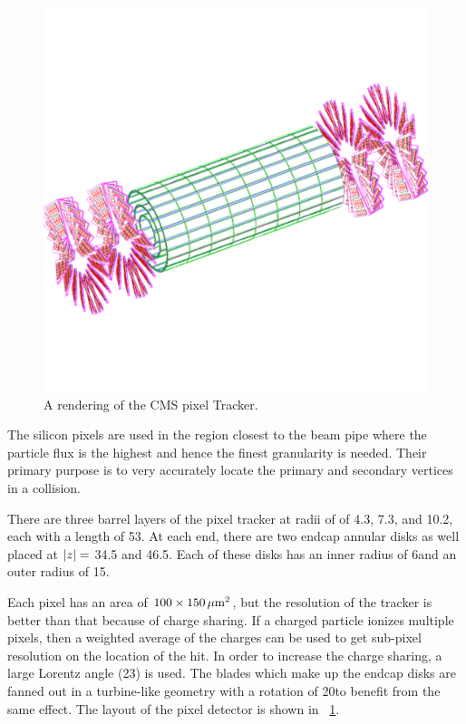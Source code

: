 \begin{figure}[!htbp]
    \centering
    \includegraphics[width=\textwidth]{figures/pixel_layout.pdf}
    \caption{
        A rendering of the CMS pixel Tracker.
    }
    \label{fig:pixel_layout}
\end{figure}

The silicon pixels are used in the region closest to the beam pipe where the
particle flux is the highest and hence the finest granularity is needed. Their
primary purpose is to very accurately locate the primary and secondary vertices
in a collision.

There are three barrel layers of the pixel tracker at radii of of 4.3, 7.3, and
10.2\centimeters, each with a length of 53\centimeters. At each end, there are
two endcap annular disks as well placed at $|z|=$ 34.5 and
46.5\centimeters. Each of these disks has an inner radius of 6\centimeters and
an outer radius of 15\centimeters.

Each pixel has an area of $100 \times 150 \text{\,$\mu$m}^{2}$, but the resolution
of the tracker is better than that because of charge sharing. If a charged
particle ionizes multiple pixels, then a weighted average of the charges can be
used to get sub-pixel resolution on the location of the hit. In order to
increase the charge sharing, a large Lorentz angle (23\degrees) is used. The
blades which make up the endcap disks are fanned out in a turbine-like geometry
with a rotation of 20\degrees to benefit from the same effect. The layout of
the pixel detector is shown in \FIG~\ref{fig:pixel_layout}.

